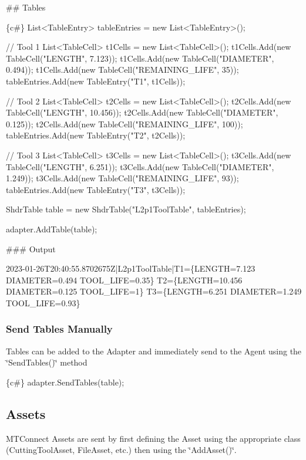 \#\# Tables 
\begin{DoxyCode}
\{c#\}
List<TableEntry> tableEntries = new List<TableEntry>();

// Tool 1
List<TableCell> t1Cells = new List<TableCell>();
t1Cells.Add(new TableCell("LENGTH", 7.123));
t1Cells.Add(new TableCell("DIAMETER", 0.494));
t1Cells.Add(new TableCell("REMAINING\_LIFE", 35));
tableEntries.Add(new TableEntry("T1", t1Cells));

// Tool 2
List<TableCell> t2Cells = new List<TableCell>();
t2Cells.Add(new TableCell("LENGTH", 10.456));
t2Cells.Add(new TableCell("DIAMETER", 0.125));
t2Cells.Add(new TableCell("REMAINING\_LIFE", 100));
tableEntries.Add(new TableEntry("T2", t2Cells));

// Tool 3
List<TableCell> t3Cells = new List<TableCell>();
t3Cells.Add(new TableCell("LENGTH", 6.251));
t3Cells.Add(new TableCell("DIAMETER", 1.249));
t3Cells.Add(new TableCell("REMAINING\_LIFE", 93));
tableEntries.Add(new TableEntry("T3", t3Cells));

ShdrTable table = new ShdrTable("L2p1ToolTable", tableEntries);

adapter.AddTable(table);
\end{DoxyCode}
 \#\#\# Output 
\begin{DoxyCode}
2023-01-26T20:40:55.8702675Z|L2p1ToolTable|T1=\{LENGTH=7.123 DIAMETER=0.494 TOOL\_LIFE=0.35\}
       T2=\{LENGTH=10.456 DIAMETER=0.125 TOOL\_LIFE=1\} T3=\{LENGTH=6.251 DIAMETER=1.249 TOOL\_LIFE=0.93\}
\end{DoxyCode}


\subsubsection*{Send Tables Manually}

Tables can be added to the Adapter and immediately send to the Agent using the \char`\"{}\+Send\+Tables()\char`\"{} method 
\begin{DoxyCode}
\{c#\}
adapter.SendTables(table);
\end{DoxyCode}


\subsection*{Assets}

M\+T\+Connect Assets are sent by first defining the Asset using the appropriate class (Cutting\+Tool\+Asset, File\+Asset, etc.) then using the \char`\"{}\+Add\+Asset()\char`\"{}.

